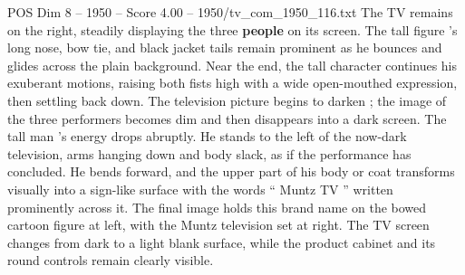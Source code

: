 \begin{textsample}{POS Dim 8 – 1950 – Score 4.00 – 1950/tv\_com\_1950\_116.txt}
The TV remains on the right, steadily displaying the three \textbf{people} on its screen.
The tall figure ’s long nose, bow tie, and black jacket tails remain prominent as he bounces and glides across the plain background.
Near the end, the tall character continues his exuberant motions, raising both fists high with a wide open-mouthed expression, then settling back down.
The television picture begins to darken ; the image of the three performers becomes dim and then disappears into a dark screen.
The tall man ’s energy drops abruptly.
He stands to the left of the now-dark television, arms hanging down and body slack, as if the performance has concluded.
He bends forward, and the upper part of his body or coat transforms visually into a sign-like surface with the words “ Muntz TV ” written prominently across it.
The final image holds this brand name on the bowed cartoon figure at left, with the Muntz television set at right.
The TV screen changes from dark to a light blank surface, while the product cabinet and its round controls remain clearly visible.

\end{textsample}
